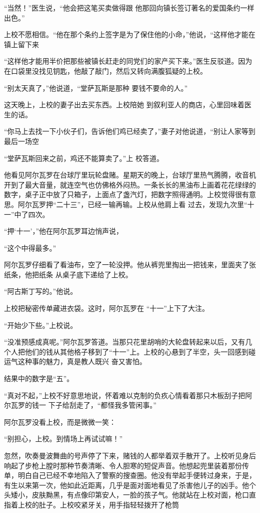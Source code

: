 \documentclass{article}
\begin{document}
“当然！”医生说，“他会把这笔买卖做得跟
他那回向镇长签订著名的爱国条约一样出色。” 

上校不愿相信。“他在那个条约上签字是为了保住他的小命，”他说，“这样他才能在镇上留下来

“这样他才能用半价把那些被镇长赶走的同党们的家产买下来。”医生反驳道。因为在口袋里没找见钥匙，他敲了敲门，然后又转向满腹狐疑的上校。

\newpage

“别太天真了，”他说道，“堂萨瓦斯是那种
要钱不要命的人。” 

这天晚上，上校的妻子出去买东西。上校陪她
到叙利亚人的商店，心里回味着医生的话。 

“你马上去找一下小伙子们，告诉他们鸡已经卖了，”妻子对他说道，“别让人家等到最后一场空

“堂萨瓦斯回来之前，鸡还不能算卖了。”上
校答道。 

他看见阿尔瓦罗在台球厅里玩轮盘赌。星期天的晚上，台球厅里热气腾腾，收音机开到了最大音量，就连空气也仿佛格外闷热。一条长长的黑油布上画着花花绿绿的数字，桌子正中放了只箱子，上面点了盏汽灯，把数字照得通明。上校觉得很有意思。阿尔瓦罗押“二十三”，已经一输再输。上校从他肩上看
过去，发现九次里“十一”中了四次。 

“押‘十一’，”他在阿尔瓦罗耳边悄声说，
\newpage

“这个中得最多。” 

阿尔瓦罗仔细看了看油布，空了一轮没押。他从裤兜里掏出一把钱来，里面夹了张纸条，他把纸条
从桌子底下递给了上校。 


“阿古斯丁写的。”他说。 

上校把秘密传单藏进衣袋。这时，阿尔瓦罗在
“十一”上下了大注。 


“开始少下些。”上校说。 

“没准预感成真呢。”阿尔瓦罗答道。当那只花里胡哨的大轮盘转起来以后，又有几个人把他们的钱从其他格子移到了“十一”上。上校的心悬到了半空，头一回感到碰运气这种事的魅力，真是教人既兴
奋又害怕。 


结果中的数字是“五”。 

\newpage

“真对不起，”上校不好意思地说，怀着难以克制的负疚心情看着那只木板刮子把阿尔瓦罗的钱一
下子给刮走了，“都怪我多管闲事。” 


阿尔瓦罗没看上校，而是微微一笑： 


“别担心，上校。到情场上再试试嘛！” 

忽然，吹奏曼波舞曲的号声停了下来，赌钱的人都举着双手散开了。上校听见身后响起了步枪上膛时那种节奏清晰、令人胆寒的短促声音。他想起兜里装着那份传单，明白自己已经不幸地陷入了警察的搜查圈。他没有举起手便转过身来，于是，有生以来第一次，他如此近距离，几乎是面对面地看见了杀害他儿子的凶手。他个头矮小，皮肤黝黑，有点像印第安人，一脸的孩子气。他就站在上校对面，枪口直指着上校的肚子。上校咬紧牙关，用手指轻轻拨开了枪筒
\end{document}
